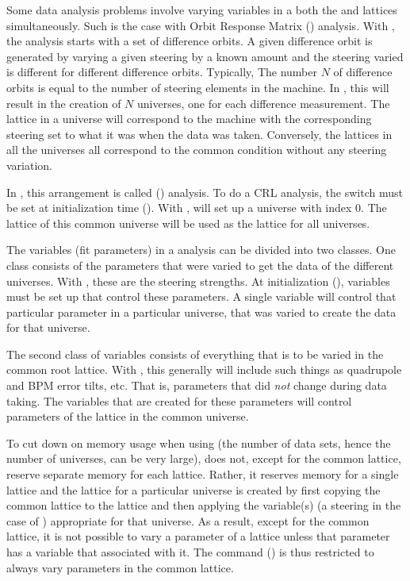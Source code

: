 {{{{{{{{Some data analysis problems involve varying variables in a both the  and 
lattices simultaneously. Such is the case with Orbit Response Matrix ()
analysis\cite{b:orm}. With , the analysis starts with a set of difference orbits. A given
difference orbit is generated by varying a given steering by a known amount and the steering varied
is different for different difference orbits. Typically, The number $N$ of difference orbits is
equal to the number of steering elements in the machine. In \tao, this will result in the creation
of $N$ universes, one for each difference measurement. The  lattice in a universe will
correspond to the machine with the corresponding steering set to what it was when the data was
taken. Conversely, the  lattices in all the universes all correspond to the common
condition without any steering variation.

In \tao, this arrangement is called  () analysis. To do a CRL
analysis, the  switch must be set at initialization time ().
With , \tao will set up a  universe with index 0.  The  lattice of
this common universe will be used as the  lattice for all universes.

The variables (fit parameters) in a  analysis can be divided into two classes. One class
consists of the parameters that were varied to get the data of the different universes. With
, these are the steering strengths. At initialization (), variables must be
set up that control these parameters. A single variable will control that particular parameter in a
particular universe, that was varied to create the data for that universe.

The second class of variables consists of everything that is to be varied in the common root
lattice. With , this generally will include such things as quadrupole and BPM error tilts,
etc. That is, parameters that did {\em not} change during data taking. The \tao variables that are
created for these parameters will control parameters of the  lattice in the common
universe.

To cut down on memory usage when using  (the number of data sets, hence the number of
universes, can be very large), \tao does not, except for the common  lattice, reserve
separate memory for each  lattice. Rather, it reserves memory for a single
 lattice and the  lattice for a particular universe is created by first
copying the common  lattice to the  lattice and then applying the variable(s)
(a steering in the case of ) appropriate for that universe.  As a result, except for the
common  lattice, it is not possible to vary a parameter of a  lattice unless
that parameter has a \tao variable that associated with it. The  command
() is thus restricted to always vary parameters in the common  lattice.

}}}}}}}}
